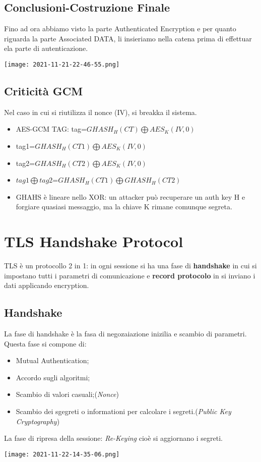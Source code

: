 \documentclass{article}
\theoremstyle{remark}
\begin{document}
\subsection{Conclusioni-Costruzione Finale}
Fino ad ora abbiamo visto la parte Authenticated Encryption e per quanto riguarda la parte Associated DATA, li insieriamo nella catena prima di
effettuar ela parte di autenticazione.
\begin{center}
    \texttt{[image: 2021-11-21-22-46-55.png]}
\end{center}
\subsection{Criticità GCM}
Nel caso in cui si riutilizza il nonce (IV), si breakka il sistema.
\begin{itemize}
    \item AES-GCM TAG: tag=\( GHASH_H(CT)\bigoplus AES_K(IV,0)\)
    \item tag1=\( GHASH_H(CT1)\bigoplus AES_K(IV,0)\)
    \item tag2=\( GHASH_H(CT2)\bigoplus AES_K(IV,0)\)
    \item \(tag1\bigoplus tag2\)=\( GHASH_H(CT1)\bigoplus GHASH_H(CT2)\)
    \item GHAHS è lineare nello XOR: un attacker può recuperare un auth key H e forgiare quasiasi messaggio, ma la chiave K rimane comunque segreta.
\end{itemize}
\section{TLS Handshake Protocol}
TLS è un protocollo 2 in 1: in ogni sessione si ha una fase di \textbf{handshake} in cui si impostano tutti i parametri di comunicazione e \textbf{record protocolo} in 
si inviano i dati applicando encryption.
\subsection{Handshake}
La fase di handshake è la fasa di negozaiazione inizilia e scambio di parametri. Questa fase si compone di:
\begin{itemize}
    \item Mutual Authentication;
    \item Accordo sugli algoritmi;
    \item Scambio di valori casuali;(\emph{Nonce})
    \item Scambio dei sgegreti o informationi per calcolare i segreti.(\emph{Public Key Cryptography})
\end{itemize}
La fase di ripresa della sessione: \emph{Re-Keying} cioè si aggiornano i segreti.
\begin{center}
    \texttt{[image: 2021-11-22-14-35-06.png]}
\end{center}
\end{document}
